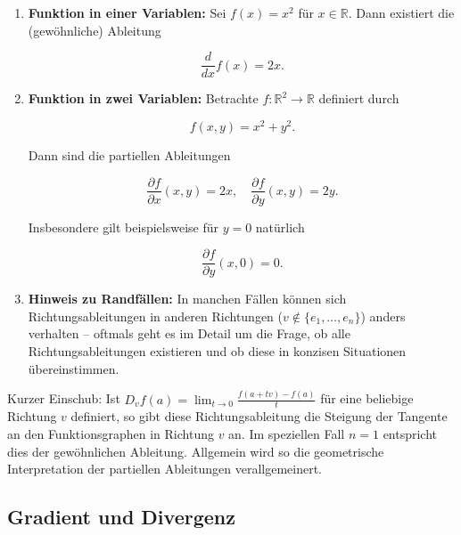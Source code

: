 \begin{beispielbox}
\begin{enumerate}
  \item \textbf{Funktion in einer Variablen:} Sei \( f(x)=x^2 \) für \( x\in \mathbb{R} \). Dann existiert die (gewöhnliche) Ableitung
  

\[
  \frac{d}{dx} f(x)= 2x.
  \]


  
  \item \textbf{Funktion in zwei Variablen:} Betrachte \( f:\mathbb{R}^2 \to \mathbb{R} \) definiert durch
  

\[
  f(x,y)= x^2+y^2.
  \]


  Dann sind die partiellen Ableitungen
  

\[
  \frac{\partial f}{\partial x}(x,y)=2x,\quad \frac{\partial f}{\partial y}(x,y)=2y.
  \]


  Insbesondere gilt beispielsweise für \( y=0 \) natürlich
  

\[
  \frac{\partial f}{\partial y}(x,0)=0.
  \]


  
  \item \textbf{Hinweis zu Randfällen:} In manchen Fällen können sich Richtungsableitungen in anderen Richtungen (\( v\notin\{e_1,\dots,e_n\} \)) anders verhalten – oftmals geht es im Detail um die Frage, ob alle Richtungsableitungen existieren und ob diese in konzisen Situationen übereinstimmen.
\end{enumerate}
\end{beispielbox}

\begin{bemerkungbox}
Kurzer Einschub: Ist \( D_v f(a) = \lim_{t\to 0} \frac{f(a+tv)-f(a)}{t} \) für eine beliebige Richtung \( v \) definiert, so gibt diese Richtungsableitung die Steigung der Tangente an den Funktionsgraphen in Richtung \( v \) an. Im speziellen Fall \( n=1 \) entspricht dies der gewöhnlichen Ableitung. Allgemein wird so die geometrische Interpretation der partiellen Ableitungen verallgemeinert.
\end{bemerkungbox}


\subsection*{Gradient und Divergenz}

